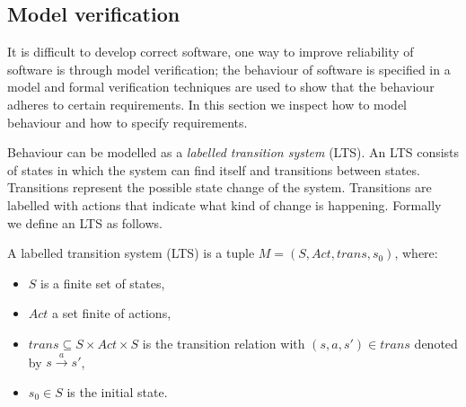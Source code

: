 \subsection{Model verification}
It is difficult to develop correct software, one way to improve reliability of software is through model verification; the behaviour of software is specified in a model and formal verification techniques are used to show that the behaviour adheres to certain requirements. In this section we inspect how to model behaviour and how to specify requirements.

Behaviour can be modelled as a \textit{labelled transition system} (LTS). An LTS consists of states in which the system can find itself and transitions between states. Transitions represent the possible state change of the system. Transitions are labelled with actions that indicate what kind of change is happening. Formally we define an LTS as follows.
\begin{definition}
	\label{def_lts}
	A labelled transition system (LTS) is a tuple $M = (S, Act, trans, s_0)$, where:
	\begin{itemize}
		\item $S$ is a finite set of states,
		\item $Act$ a set finite of actions,
		\item $trans \subseteq S \times Act \times S$ is the transition relation with $(s,a,s') \in trans$ denoted by $s \xrightarrow a s'$,
		\item $s_0 \in S$ is the initial state.
	\end{itemize}
\end{definition}

